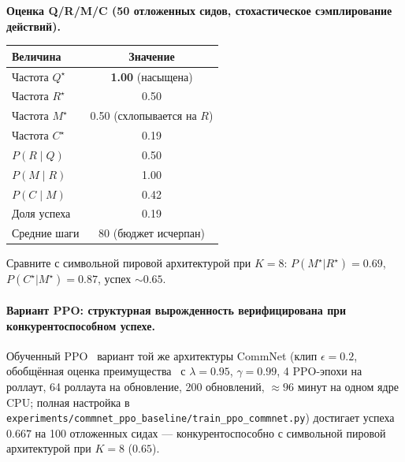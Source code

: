 \documentclass{article}
\begin{document}
\textbf{Оценка Q/R/M/C (50 отложенных сидов, стохастическое сэмплирование действий).}

\begin{table}[h]
\centering
\small
\begin{tabular}{l c}
\toprule
Величина & Значение \\
\midrule
Частота $Q^\star$                              & \textbf{1.00} (насыщена) \\
Частота $R^\star$                              & 0.50 \\
Частота $M^\star$                              & 0.50 (схлопывается на $R$) \\
Частота $C^\star$                              & 0.19 \\
$P(R \mid Q)$                               & 0.50 \\
$P(M \mid R)$                               & 1.00 \\
$P(C \mid M)$                               & 0.42 \\
Доля успеха                                & 0.19 \\
Средние шаги                                  & 80 (бюджет исчерпан) \\
\bottomrule
\end{tabular}
\end{table}

Сравните с символьной пировой архитектурой при $K{=}8$: $P(M^\star|R^\star){=}0.69$, $P(C^\star|M^\star){=}0.87$, успех $\sim 0.65$.

\paragraph{Вариант PPO: структурная вырожденность верифицирована при конкурентоспособном успехе.}
Обученный PPO~\citep{schulman2017proximal} вариант той же архитектуры CommNet (клип $\epsilon{=}0.2$, обобщённая оценка преимущества~\citep{schulman2016gae} с $\lambda{=}0.95$, $\gamma{=}0.99$, 4 PPO-эпохи на роллаут, 64 роллаута на обновление, 200 обновлений, $\approx 96$ минут на одном ядре CPU; полная настройка в \texttt{experiments/commnet\_ppo\_baseline/train\_ppo\_commnet.py}) достигает успеха $0.667$ на 100 отложенных сидах --- конкурентоспособно с символьной пировой архитектурой при $K{=}8$ ($0.65$).
\end{document}
